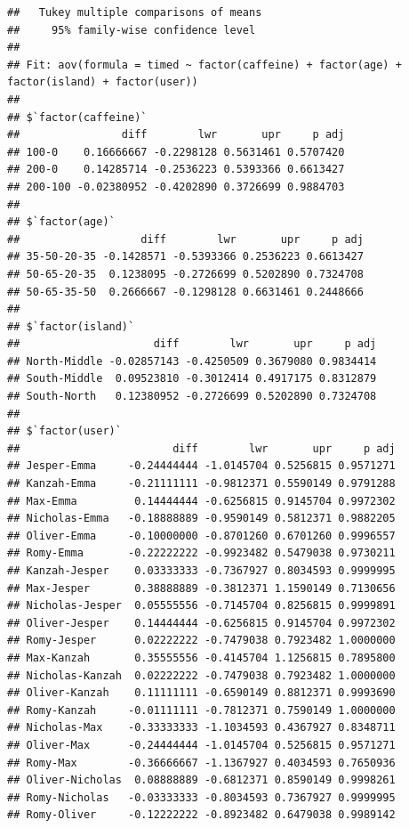 \documentclass[
]{article}
\begin{document}
\begin{verbatim}
##   Tukey multiple comparisons of means
##     95% family-wise confidence level
## 
## Fit: aov(formula = timed ~ factor(caffeine) + factor(age) + factor(island) + factor(user))
## 
## $`factor(caffeine)`
##                diff        lwr       upr     p adj
## 100-0    0.16666667 -0.2298128 0.5631461 0.5707420
## 200-0    0.14285714 -0.2536223 0.5393366 0.6613427
## 200-100 -0.02380952 -0.4202890 0.3726699 0.9884703
## 
## $`factor(age)`
##                   diff        lwr       upr     p adj
## 35-50-20-35 -0.1428571 -0.5393366 0.2536223 0.6613427
## 50-65-20-35  0.1238095 -0.2726699 0.5202890 0.7324708
## 50-65-35-50  0.2666667 -0.1298128 0.6631461 0.2448666
## 
## $`factor(island)`
##                     diff        lwr       upr     p adj
## North-Middle -0.02857143 -0.4250509 0.3679080 0.9834414
## South-Middle  0.09523810 -0.3012414 0.4917175 0.8312879
## South-North   0.12380952 -0.2726699 0.5202890 0.7324708
## 
## $`factor(user)`
##                        diff        lwr       upr     p adj
## Jesper-Emma     -0.24444444 -1.0145704 0.5256815 0.9571271
## Kanzah-Emma     -0.21111111 -0.9812371 0.5590149 0.9791288
## Max-Emma         0.14444444 -0.6256815 0.9145704 0.9972302
## Nicholas-Emma   -0.18888889 -0.9590149 0.5812371 0.9882205
## Oliver-Emma     -0.10000000 -0.8701260 0.6701260 0.9996557
## Romy-Emma       -0.22222222 -0.9923482 0.5479038 0.9730211
## Kanzah-Jesper    0.03333333 -0.7367927 0.8034593 0.9999995
## Max-Jesper       0.38888889 -0.3812371 1.1590149 0.7130656
## Nicholas-Jesper  0.05555556 -0.7145704 0.8256815 0.9999891
## Oliver-Jesper    0.14444444 -0.6256815 0.9145704 0.9972302
## Romy-Jesper      0.02222222 -0.7479038 0.7923482 1.0000000
## Max-Kanzah       0.35555556 -0.4145704 1.1256815 0.7895800
## Nicholas-Kanzah  0.02222222 -0.7479038 0.7923482 1.0000000
## Oliver-Kanzah    0.11111111 -0.6590149 0.8812371 0.9993690
## Romy-Kanzah     -0.01111111 -0.7812371 0.7590149 1.0000000
## Nicholas-Max    -0.33333333 -1.1034593 0.4367927 0.8348711
## Oliver-Max      -0.24444444 -1.0145704 0.5256815 0.9571271
## Romy-Max        -0.36666667 -1.1367927 0.4034593 0.7650936
## Oliver-Nicholas  0.08888889 -0.6812371 0.8590149 0.9998261
## Romy-Nicholas   -0.03333333 -0.8034593 0.7367927 0.9999995
## Romy-Oliver     -0.12222222 -0.8923482 0.6479038 0.9989142
\end{verbatim}
\end{document}
